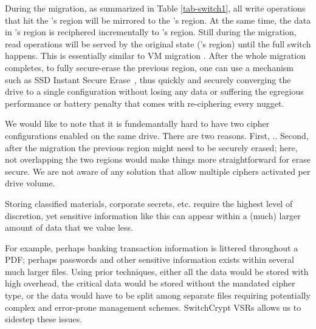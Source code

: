 During the migration, as summarized in Table \ref{tab-switch1}, all write
operations that hit the \cone's region will be mirrored to the \ctwo's
region.  At the same time, the data in \cone's region is reciphered
incrementally to \ctwo's region.  Still during the migration, read
operations will be served by the original state (\cone's region) until the
full switch happens.  This is essentially similar to VM migration
\cite{google-live-vm-migration-nsdi}.  After the whole migration
completes, to fully secure-erase the previous region, one can use a
mechanism such as SSD Instant Secure Erase~\cite{ISE1,ISE2,ISE3}, thus
quickly and securely converging the drive to a single configuration
without losing any data or suffering the egregious performance or battery
penalty that comes with re-ciphering every nugget.

We would like to note that it is fundemantally hard to have two cipher
configurations enabled on the same drive.  There are two reasons.  First,
..  Second,
after the migration the previous region might need to be securely erased;
here, not overlapping the two regions would make things more
straightforward for erase secure.  We are not aware of any solution that
allow multiple ciphers activated per drive volume.







Storing classified materials, corporate secrets, etc. require the highest level
of discretion, yet sensitive information like this can appear within a (much)
larger amount of data that we value less. 


For example,
perhaps banking transaction information is littered throughout a PDF; perhaps
passwords and other sensitive information exists within several much larger
files. Using prior techniques, either all the data would be stored with high
overhead, the critical data would be stored without the mandated cipher type, or
the data would have to be split among separate files requiring potentially
complex and error-prone management schemes. SwitchCrypt VSRs allows us to
sidestep these issues.


